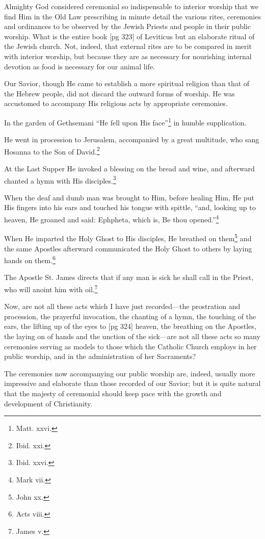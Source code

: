 Almighty God considered ceremonial so indispensable
to interior worship that we find Him
in the Old Law prescribing in minute detail the
various rites, ceremonies and ordinances to be
observed by the Jewish Priests and people in
their public worship. What is the entire book
[pg 323]
of Leviticus but an elaborate ritual of the Jewish
church. Not, indeed, that external rites are to be
compared in merit with interior worship, but because
they are as necessary for nourishing internal
devotion as food is necessary for our animal life.

Our Savior, though He came to establish a more
spiritual religion than that of the Hebrew people,
did not discard the outward forms of worship. He
was accustomed to accompany His religious acts
by appropriate ceremonies.

In the garden of Gethsemani “He fell upon His
face”\footnote{Matt. xxvi.} in humble supplication.

He went in procession to Jerusalem, accompanied
by a great multitude, who sang Hosanna to the
Son of David.\footnote{Ibid. xxi.}

At the Last Supper He invoked a blessing on the
bread and wine, and afterward chanted a hymn
with His disciples.\footnote{Ibid. xxvi.}

When the deaf and dumb man was brought to
Him, before healing Him, He put His fingers into
his ears and touched his tongue with spittle, “and,
looking up to heaven, He groaned and said:
Ephpheta, which is, Be thou opened.”\footnote{Mark vii.}

When He imparted the Holy Ghost to His disciples,
He breathed on them\footnote{John xx.} and the same Apostles
afterward communicated the Holy Ghost to
others by laying hands on them.\footnote{Acts viii.}

The Apostle St. James directs that if any man
is sick he shall call in the Priest, who will anoint
him with oil.\footnote{James v.}

Now, are not all these acts which I have just
recorded—the prostration and procession, the
prayerful invocation, the chanting of a hymn, the
touching of the ears, the lifting up of the eyes to
[pg 324]
heaven, the breathing on the Apostles, the laying
on of hands and the unction of the sick—are not
all these acts so many ceremonies serving as models
to those which the Catholic Church employs in
her public worship, and in the administration of
her Sacraments?

The ceremonies now accompanying our public
worship are, indeed, usually more impressive and
elaborate than those recorded of our Savior; but
it is quite natural that the majesty of ceremonial
should keep pace with the growth and development
of Christianity.

